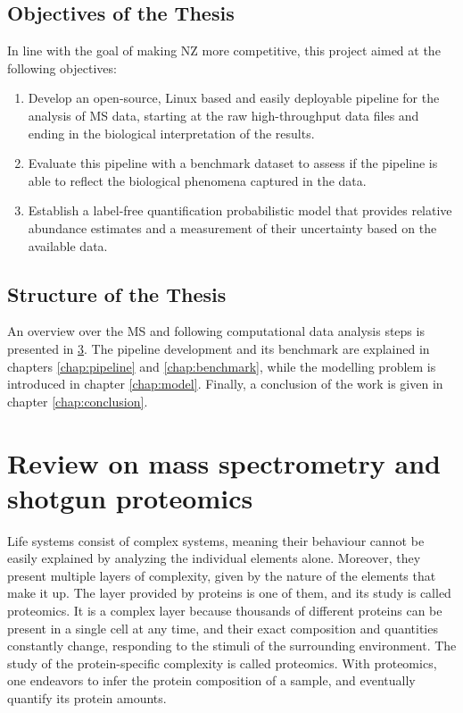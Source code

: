 \documentclass[11pt, a4paper]{report}
\begin{document}
\section{Objectives of the Thesis}
\label{sec:objectives}

In line with the goal of making \ac{NZ} more competitive, this project aimed at the following objectives:

\begin{enumerate}

\item Develop an open-source, Linux based and easily deployable pipeline for the analysis of \ac{MS} data, starting at the raw high-throughput data files and ending in the  biological interpretation of the results.

\item Evaluate this pipeline with a benchmark dataset to assess if the pipeline is able to reflect the biological phenomena captured in the data.

\item Establish a label-free quantification probabilistic model that provides relative abundance estimates and a measurement of their uncertainty based on the available data.

\end{enumerate}

\section{Structure of the Thesis}

An overview over the \ac{MS} and following computational data analysis steps is presented in \ref{chap:mass_spec}. The pipeline development and its benchmark are explained in chapters \ref{chap:pipeline} and \ref{chap:benchmark}, while the modelling problem is introduced in chapter \ref{chap:model}. Finally, a conclusion of the work is given in chapter \ref{chap:conclusion}.


\chapter{Review on mass spectrometry and shotgun proteomics}
\label{chap:mass_spec}

Life systems consist of complex systems, meaning their behaviour cannot be easily explained by analyzing the individual elements alone. Moreover, they present multiple layers of complexity, given by the nature of the elements that make it up. The layer provided by proteins is one of them, and its study is called proteomics. It is a complex layer because thousands of different proteins can be present in a single cell at any time, and their exact composition and quantities constantly change, responding to the stimuli of the surrounding environment. The study of the protein-specific complexity is called proteomics. With proteomics, one endeavors to infer the protein composition of a sample, and eventually quantify its protein amounts.
\end{document}
